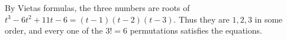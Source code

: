 By Vieta\textquotesingle s formulas, the three numbers are roots of $t^3-6t^2+11t-6=(t-1)(t-2)(t-3)$. Thus they are $1,2,3$ in some order, and every one of the $3!=6$ permutations satisfies the equations.
